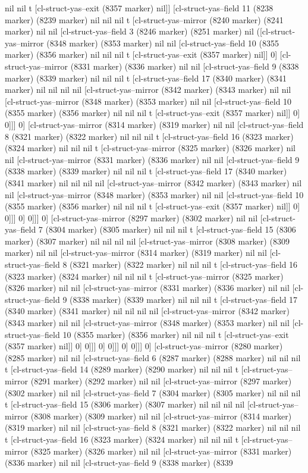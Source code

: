 {{nil nil t [cl-struct-yas--exit (8357 marker) nil]] [cl-struct-yas--field 11 (8238 marker) (8239 marker) nil nil nil t [cl-struct-yas--mirror (8240 marker) (8241 marker) nil nil [cl-struct-yas--field 3 (8246 marker) (8251 marker) nil ([cl-struct-yas--mirror (8348 marker) (8353 marker) nil nil [cl-struct-yas--field 10 (8355 marker) (8356 marker) nil nil nil t [cl-struct-yas--exit (8357 marker) nil]] 0] [cl-struct-yas--mirror (8331 marker) (8336 marker) nil nil [cl-struct-yas--field 9 (8338 marker) (8339 marker) nil nil nil t [cl-struct-yas--field 17 (8340 marker) (8341 marker) nil nil nil nil [cl-struct-yas--mirror (8342 marker) (8343 marker) nil nil [cl-struct-yas--mirror (8348 marker) (8353 marker) nil nil [cl-struct-yas--field 10 (8355 marker) (8356 marker) nil nil nil t [cl-struct-yas--exit (8357 marker) nil]] 0] 0]]] 0] [cl-struct-yas--mirror (8314 marker) (8319 marker) nil nil [cl-struct-yas--field 8 (8321 marker) (8322 marker) nil nil nil t [cl-struct-yas--field 16 (8323 marker) (8324 marker) nil nil nil t [cl-struct-yas--mirror (8325 marker) (8326 marker) nil nil [cl-struct-yas--mirror (8331 marker) (8336 marker) nil nil [cl-struct-yas--field 9 (8338 marker) (8339 marker) nil nil nil t [cl-struct-yas--field 17 (8340 marker) (8341 marker) nil nil nil nil [cl-struct-yas--mirror (8342 marker) (8343 marker) nil nil [cl-struct-yas--mirror (8348 marker) (8353 marker) nil nil [cl-struct-yas--field 10 (8355 marker) (8356 marker) nil nil nil t [cl-struct-yas--exit (8357 marker) nil]] 0] 0]]] 0] 0]]] 0] [cl-struct-yas--mirror (8297 marker) (8302 marker) nil nil [cl-struct-yas--field 7 (8304 marker) (8305 marker) nil nil nil t [cl-struct-yas--field 15 (8306 marker) (8307 marker) nil nil nil nil [cl-struct-yas--mirror (8308 marker) (8309 marker) nil nil [cl-struct-yas--mirror (8314 marker) (8319 marker) nil nil [cl-struct-yas--field 8 (8321 marker) (8322 marker) nil nil nil t [cl-struct-yas--field 16 (8323 marker) (8324 marker) nil nil nil t [cl-struct-yas--mirror (8325 marker) (8326 marker) nil nil [cl-struct-yas--mirror (8331 marker) (8336 marker) nil nil [cl-struct-yas--field 9 (8338 marker) (8339 marker) nil nil nil t [cl-struct-yas--field 17 (8340 marker) (8341 marker) nil nil nil nil [cl-struct-yas--mirror (8342 marker) (8343 marker) nil nil [cl-struct-yas--mirror (8348 marker) (8353 marker) nil nil [cl-struct-yas--field 10 (8355 marker) (8356 marker) nil nil nil t [cl-struct-yas--exit (8357 marker) nil]] 0] 0]]] 0] 0]]] 0] 0]]] 0] [cl-struct-yas--mirror (8280 marker) (8285 marker) nil nil [cl-struct-yas--field 6 (8287 marker) (8288 marker) nil nil nil t [cl-struct-yas--field 14 (8289 marker) (8290 marker) nil nil nil t [cl-struct-yas--mirror (8291 marker) (8292 marker) nil nil [cl-struct-yas--mirror (8297 marker) (8302 marker) nil nil [cl-struct-yas--field 7 (8304 marker) (8305 marker) nil nil nil t [cl-struct-yas--field 15 (8306 marker) (8307 marker) nil nil nil nil [cl-struct-yas--mirror (8308 marker) (8309 marker) nil nil [cl-struct-yas--mirror (8314 marker) (8319 marker) nil nil [cl-struct-yas--field 8 (8321 marker) (8322 marker) nil nil nil t [cl-struct-yas--field 16 (8323 marker) (8324 marker) nil nil nil t [cl-struct-yas--mirror (8325 marker) (8326 marker) nil nil [cl-struct-yas--mirror (8331 marker) (8336 marker) nil nil [cl-struct-yas--field 9 (8338 marker) (8339 }}
